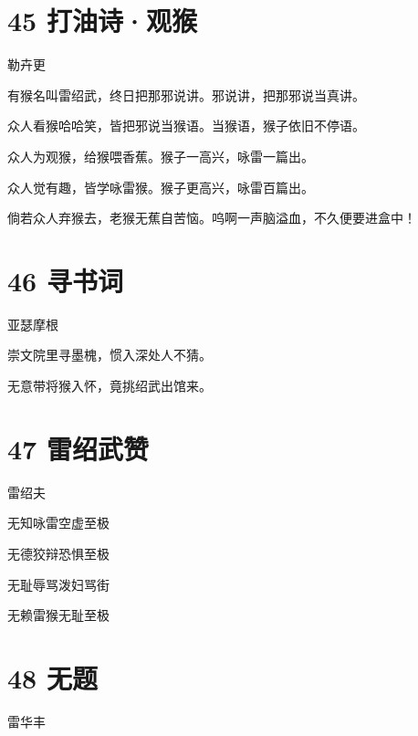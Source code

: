 \documentclass[UTF8,12pt,oneside]{ctexbook}
\begin{document}
        \section{45 打油诗·观猴}
        \begin{center}
            勒卉更
        \end{center}
        
        有猴名叫雷绍武，终日把那邪说讲。邪说讲，把那邪说当真讲。
        
        众人看猴哈哈笑，皆把邪说当猴语。当猴语，猴子依旧不停语。
        
        众人为观猴，给猴喂香蕉。猴子一高兴，咏雷一篇出。
        
        众人觉有趣，皆学咏雷猴。猴子更高兴，咏雷百篇出。
        
        倘若众人弃猴去，老猴无蕉自苦恼。呜啊一声脑溢血，不久便要进盒中！
        
        \newpage
        
        \section{46 寻书词}
        \begin{center}
            亚瑟摩根
        \end{center}
        
        \begin{center}
            崇文院里寻墨槐，惯入深处人不猜。
        
            无意带将猴入怀，竟挑绍武出馆来。
        \end{center}
        
        \section{47 雷绍武赞}
        \begin{center}
            雷绍夫
        \end{center}
        
        \begin{center}
            无知咏雷空虚至极
            
            无德狡辩恐惧至极
            
            无耻辱骂泼妇骂街
            
            无赖雷猴无耻至极
        \end{center}
        
        \section{48 无题}
        \begin{center}
            雷华丰
        \end{center}
        
\end{document}
